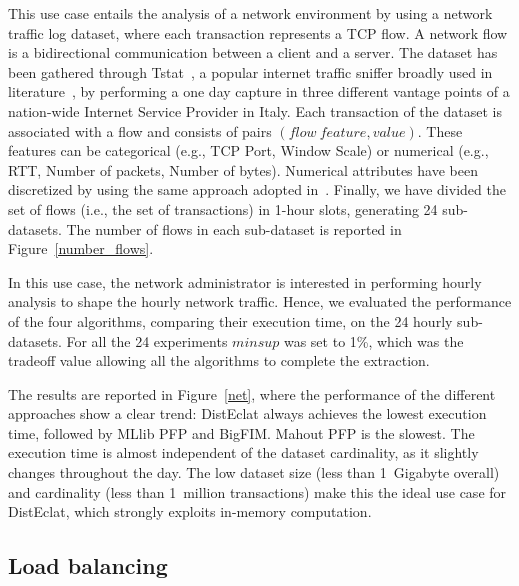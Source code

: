 \documentclass[preprint,review,12pt]{elsarticle}
\begin{document}
This use case entails the analysis of a network environment by
using a network traffic log dataset, where each transaction represents a TCP flow.
A network flow is a bidirectional communication between a client and a server.
The dataset has been gathered through Tstat~\cite{Tstat,Tstat2}, a popular
internet traffic sniffer broadly used in
literature~\cite{giordano2015youlighter,ApilettiBCCG13},
by performing a one day capture in three different vantage points
of a nation-wide Internet Service Provider in Italy.
Each transaction of the dataset is associated with
a flow and consists of pairs $(flow~feature, value)$. These features can be
categorical (e.g., TCP Port, Window Scale) or numerical (e.g., RTT,
Number of packets, Number of bytes). Numerical attributes have been discretized by using the same
approach adopted in~\cite{ApilettiBCCG13}.
Finally, we have divided the set of flows (i.e., the set of transactions)
in 1-hour slots, generating 24 sub-datasets.
The number of flows in each sub-dataset
is reported in Figure~\ref{number_flows}.

In this use case, the network administrator is interested in performing hourly
analysis to shape the hourly network traffic.
Hence, we evaluated the performance of the four algorithms,
comparing their execution time, on the 24 hourly sub-datasets.
For all the 24 experiments $minsup$ was set to 1\%, which was
the tradeoff value allowing all the algorithms to complete the extraction.

The results are reported in Figure~\ref{net}, where the performance of the
different approaches show a clear trend: DistEclat always achieves the
lowest execution time, followed by MLlib PFP and BigFIM.
Mahout PFP is the slowest.
The execution time is almost independent of the dataset cardinality,
as it slightly changes throughout the day.
The low dataset size (less than 1~Gigabyte overall)
and cardinality (less than 1~million transactions) make this the ideal
use case for DistEclat, which strongly exploits in-memory computation.



\subsection{Load balancing}
\label{load_exp}
\end{document}
